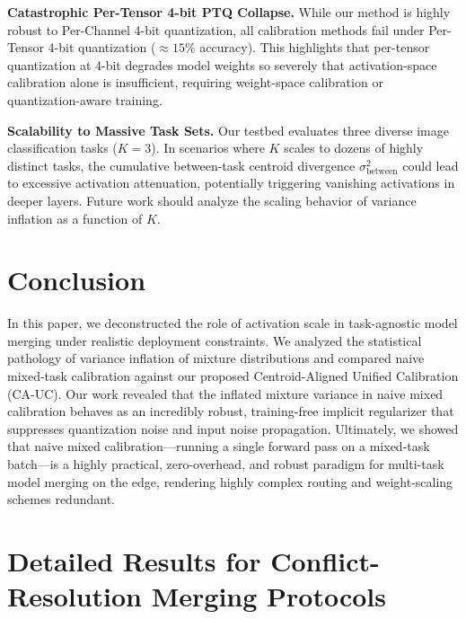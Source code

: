 \documentclass{article}
\theoremstyle{plain}
\theoremstyle{definition}
\theoremstyle{remark}
\begin{document}
\textbf{Catastrophic Per-Tensor 4-bit PTQ Collapse.} While our method is highly robust to Per-Channel 4-bit quantization, all calibration methods fail under Per-Tensor 4-bit quantization ($\approx 15\%$ accuracy). This highlights that per-tensor quantization at 4-bit degrades model weights so severely that activation-space calibration alone is insufficient, requiring weight-space calibration or quantization-aware training.

\textbf{Scalability to Massive Task Sets.} Our testbed evaluates three diverse image classification tasks ($K=3$). In scenarios where $K$ scales to dozens of highly distinct tasks, the cumulative between-task centroid divergence $\sigma^2_{\text{between}}$ could lead to excessive activation attenuation, potentially triggering vanishing activations in deeper layers. Future work should analyze the scaling behavior of variance inflation as a function of $K$.

\vspace{-8pt}
\section{Conclusion}
\label{sec:conclusion}

In this paper, we deconstructed the role of activation scale in task-agnostic model merging under realistic deployment constraints. We analyzed the statistical pathology of variance inflation of mixture distributions and compared naive mixed-task calibration against our proposed Centroid-Aligned Unified Calibration (CA-UC). Our work revealed that the inflated mixture variance in naive mixed calibration behaves as an incredibly robust, training-free implicit regularizer that suppresses quantization noise and input noise propagation. Ultimately, we showed that naive mixed calibration---running a single forward pass on a mixed-task batch---is a highly practical, zero-overhead, and robust paradigm for multi-task model merging on the edge, rendering highly complex routing and weight-scaling schemes redundant.




\newpage
\appendix
\onecolumn
\section{Detailed Results for Conflict-Resolution Merging Protocols}
\label{sec:appendix_tables}
\end{document}

